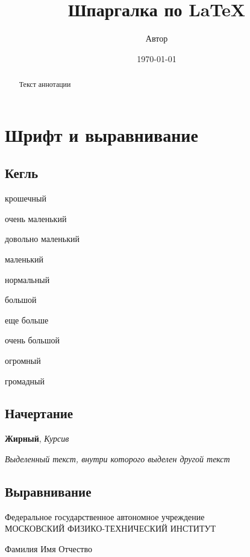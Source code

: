 

\author{Автор}
\title{Шпаргалка по \LaTeX}
\date{\today}



\maketitle

\renewcommand{\abstractname}{Краткое содержание}
\begin{abstract}
    Текст аннотации
\end{abstract}

\section{Шрифт и выравнивание}
\subsection{Кегль}
\tiny крошечный

\scriptsize очень маленький

\footnotesize довольно маленький

\small маленький

\normalsize нормальный

\large большой

\Large еще больше

\LARGE очень большой

\begin{huge}
    огромный
\end{huge}

{\Huge громадный}
\normalsize


\subsection{Начертание}
\textbf{Жирный},
\textit{Курсив}

\emph{Выделенный текст, \emph{внутри которого выделен} другой текст}

\subsection{Выравнивание}
\thispagestyle{empty}
\begin{center}
    Федеральное государственное автономное учреждение\\
    МОСКОВСКИЙ ФИЗИКО-ТЕХНИЧЕСКИЙ ИНСТИТУТ
\end{center}
\vspace{3ex}
\begin{flushright}
    \noindent
    Фамилия Имя Отчество
\end{flushright}

